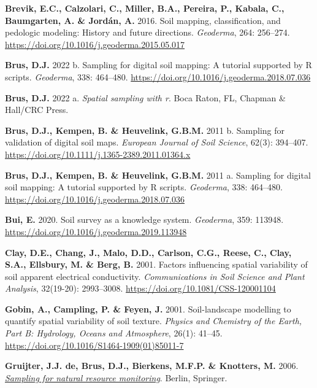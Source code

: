 \documentclass[
  10pt,
  b5paper,
  oneside]{book}
\newlength{\cslhangindent}
\newenvironment{CSLReferences}[2] %
 {\begin{list}{}{%
  \setlength{\itemindent}{0pt}
  \setlength{\leftmargin}{0pt}
  \setlength{\parsep}{0pt}
  \ifodd #1
   \setlength{\leftmargin}{\cslhangindent}
   \setlength{\itemindent}{-1\cslhangindent}
  \fi
  \setlength{\itemsep}{#2\baselineskip}}}
 {\end{list}}
\begin{document}
\begin{CSLReferences}{0}{0}
\textbf{Brevik, E.C., Calzolari, C., Miller, B.A., Pereira, P., Kabala, C., Baumgarten, A. \& Jordán, A.} 2016. Soil mapping, classification, and pedologic modeling: History and future directions. \emph{Geoderma}, 264: 256--274. \url{https://doi.org/10.1016/j.geoderma.2015.05.017}

\textbf{Brus, D.J.} 2022 b. Sampling for digital soil mapping: A tutorial supported by {R} scripts. \emph{Geoderma}, 338: 464--480. \url{https://doi.org/10.1016/j.geoderma.2018.07.036}

\textbf{Brus, D.J.} 2022 a. \emph{Spatial sampling with r}. Boca Raton, FL, Chapman \& Hall/CRC Press.

\textbf{Brus, D.J., Kempen, B. \& Heuvelink, G.B.M.} 2011 b. Sampling for validation of digital soil maps. \emph{European Journal of Soil Science}, 62(3): 394--407. \url{https://doi.org/10.1111/j.1365-2389.2011.01364.x}

\textbf{Brus, D.J., Kempen, B. \& Heuvelink, G.B.M.} 2011 a. Sampling for digital soil mapping: A tutorial supported by {R} scripts. \emph{Geoderma}, 338: 464--480. \url{https://doi.org/10.1016/j.geoderma.2018.07.036}

\textbf{Bui, E.} 2020. Soil survey as a knowledge system. \emph{Geoderma}, 359: 113948. \url{https://doi.org/10.1016/j.geoderma.2019.113948}

\textbf{Clay, D.E., Chang, J., Malo, D.D., Carlson, C.G., Reese, C., Clay, S.A., Ellsbury, M. \& Berg, B.} 2001. Factors influencing spatial variability of soil apparent electrical conductivity. \emph{Communications in Soil Science and Plant Analysis}, 32(19-20): 2993--3008. \url{https://doi.org/10.1081/CSS-120001104}

\textbf{Gobin, A., Campling, P. \& Feyen, J.} 2001. Soil-landscape modelling to quantify spatial variability of soil texture. \emph{Physics and Chemistry of the Earth, Part B: Hydrology, Oceans and Atmosphere}, 26(1): 41--45. \url{https://doi.org/10.1016/S1464-1909(01)85011-7}

\textbf{Gruijter, J.J. de, Brus, D.J., Bierkens, M.F.P. \& Knotters, M.} 2006. \emph{\href{https://doi.org/10.1007/3-540-33161-1}{Sampling for natural resource monitoring}}. Berlin, Springer.


\end{CSLReferences}
\end{document}
